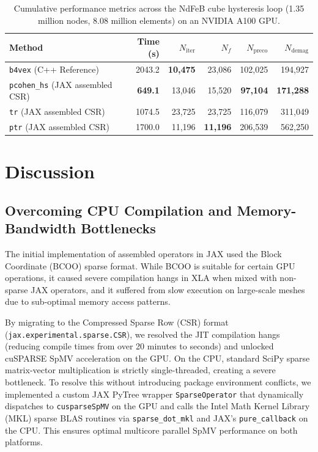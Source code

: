 \documentclass[11pt,a4paper]{article}
\begin{document}
\begin{table}[h]
    \centering
    \begin{tabular}{lrrrrr}
        \toprule
        \textbf{Method} & \textbf{Time (s)} & $N_{\text{iter}}$ & $N_f$ & $N_{\text{preco}}$ & $N_{\text{demag}}$ \\
        \midrule
        \texttt{b4vex} (C++ Reference) & 2043.2 & \textbf{10,475} & 23,086 & 102,025 & 194,927 \\
        \texttt{pcohen\_hs} (JAX assembled CSR) & \textbf{649.1} & 13,046 & 15,520 & \textbf{97,104} & \textbf{171,288} \\
        \texttt{tr} (JAX assembled CSR)       & 1074.5 & 23,725 & 23,725 & 116,079 & 311,049 \\
        \texttt{ptr} (JAX assembled CSR)      & 1700.0 & 11,196 & \textbf{11,196} & 206,539 & 562,250 \\
        \bottomrule
    \end{tabular}
    \caption{Cumulative performance metrics across the NdFeB cube hysteresis loop (1.35 million nodes, 8.08 million elements) on an NVIDIA A100 GPU.}
    \label{tab:results}
\end{table}

\section{Discussion}

\subsection{Overcoming CPU Compilation and Memory-Bandwidth Bottlenecks}
The initial implementation of assembled operators in JAX used the Block Coordinate (BCOO) sparse format. While BCOO is suitable for certain GPU operations, it caused severe compilation hangs in XLA when mixed with non-sparse JAX operators, and it suffered from slow execution on large-scale meshes due to sub-optimal memory access patterns.

By migrating to the Compressed Sparse Row (CSR) format (\texttt{jax.experimental.sparse.CSR}), we resolved the JIT compilation hangs (reducing compile times from over 20 minutes to seconds) and unlocked cuSPARSE SpMV acceleration on the GPU. On the CPU, standard SciPy sparse matrix-vector multiplication is strictly single-threaded, creating a severe bottleneck. To resolve this without introducing package environment conflicts, we implemented a custom JAX PyTree wrapper \texttt{SparseOperator} that dynamically dispatches to \texttt{cusparseSpMV} on the GPU and calls the Intel Math Kernel Library (MKL) sparse BLAS routines via \texttt{sparse\_dot\_mkl} and JAX's \texttt{pure\_callback} on the CPU. This ensures optimal multicore parallel SpMV performance on both platforms.
\end{document}
